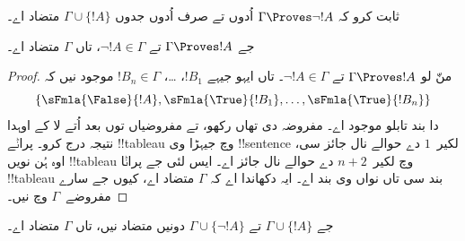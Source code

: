 \documentclass[../../../include/open-logic-section]{subfiles}
\begin{document}
\begin{prob}
ثابت کرو کہ $\Gamma \Proves \lnot !A$ اُدوں تے صرف اُدوں جدوں
$\Gamma \cup \{!A\}$ متضاد اے۔
\end{prob}

\begin{prop}
  جے $\Gamma \Proves !A$ تے $\lnot !A \in \Gamma$، تاں $\Gamma$
  متضاد اے۔
\end{prop}

\begin{proof}
  منّ لو $\Gamma \Proves !A$ تے $\lnot !A \in \Gamma$۔ تاں ایہو جیہے
  $!B_1$، \dots، $!B_n \in \Gamma$ موجود نیں کہ
  \[
  \{\sFmla{\False}{!A}, \sFmla{\True}{!B_1}, \dots, \sFmla{\True}{!B_n}\}
  \]
  دا بند تابلو موجود اے۔ مفروضہ  دی تھاں
   رکھو، تے مفروضیاں توں بعد
   اُتے \TRule{\True}{\lnot} لا کے اوہدا نتیجہ
  درج کرو۔ پراݨے !!{tableau} وچ جیہڑا وی !!{sentence} لکیر~$1$ دے
  حوالے نال جائز سی، اوہ ہُن نویں !!{tableau} وچ
  لکیر~$n+2$ دے حوالے نال جائز اے۔ ایس لئی جے پراݨا !!{tableau}
  بند سی تاں نواں وی بند اے۔ ایہ دکھاندا اے کہ $\Gamma$ متضاد اے،
  کیوں جے سارے مفروضے~$\Gamma$ وچ نیں۔
\end{proof}

\begin{prop}
  جے $\Gamma \cup \{!A\}$ تے $\Gamma \cup \{\lnot !A\}$ دونیں
  متضاد نیں، تاں $\Gamma$ متضاد اے۔
\end{prop}
\end{document}
